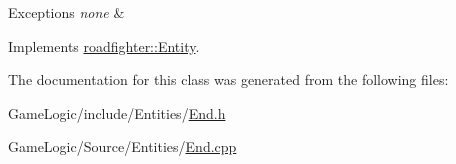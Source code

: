 \begin{DoxyExceptions}{Exceptions}
{\em none} & \\
\hline
\end{DoxyExceptions}


Implements \hyperlink{classroadfighter_1_1Entity_a66614a11004d6f9516473f60b530f689}{roadfighter\+::\+Entity}.



The documentation for this class was generated from the following files\+:\begin{DoxyCompactItemize}
\item 
Game\+Logic/include/\+Entities/\hyperlink{End_8h}{End.\+h}\item 
Game\+Logic/\+Source/\+Entities/\hyperlink{End_8cpp}{End.\+cpp}\end{DoxyCompactItemize}
